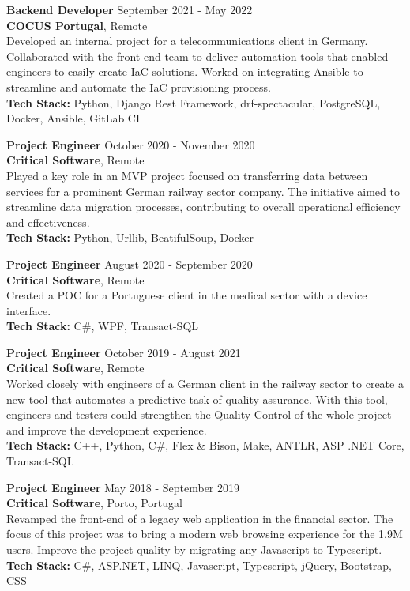 \documentclass[margin, 10pt]{res} %
\begin{document}
\begin{resume}
    \textbf{Backend Developer} \hfill September 2021 - May 2022\\
    \textbf{COCUS Portugal}, Remote\\
    Developed an internal project for a telecommunications client in Germany. Collaborated with the front-end team to deliver automation tools that enabled engineers to easily create IaC solutions. Worked on integrating Ansible to streamline and automate the IaC provisioning process.\\
    \textbf{Tech Stack:} Python, Django Rest Framework, drf-spectacular, PostgreSQL, Docker, Ansible, GitLab CI


    \textbf{Project Engineer} \hfill October 2020 - November 2020\\
    \textbf{Critical Software}, Remote\\
    Played a key role in an MVP project focused on transferring data between services for a prominent German railway sector company. The initiative aimed to streamline data migration processes, contributing to overall operational efficiency and effectiveness.\\
    \textbf {Tech Stack:} Python, Urllib, BeatifulSoup, Docker


    \textbf{Project Engineer} \hfill August 2020 - September 2020\\
    \textbf{Critical Software}, Remote\\
    Created a POC for a Portuguese client in the medical sector with a device interface.\\
    \textbf {Tech Stack:} C\#, WPF, Transact-SQL


    \textbf{Project Engineer} \hfill October 2019 - August 2021\\
    \textbf{Critical Software}, Remote\\
    Worked closely with engineers of a German client in the railway sector to create a new tool that automates a predictive task of quality assurance. With this tool, engineers and testers could strengthen the Quality Control of the whole project and improve the development experience.\\  
    \textbf {Tech Stack:} C++, Python, C\#, Flex \& Bison, Make, ANTLR, ASP .NET Core, Transact-SQL


    \textbf{Project Engineer} \hfill May 2018 - September 2019\\
    \textbf{Critical Software}, Porto, Portugal\\
    Revamped the front-end of a legacy web application in the financial sector. The focus of this project was to bring a modern web browsing experience for the 1.9M users. Improve the project quality by migrating any Javascript to Typescript.\\
    \textbf {Tech Stack:} C\#, ASP.NET, LINQ, Javascript, Typescript, jQuery, Bootstrap, CSS


\end{resume}
\end{document}
